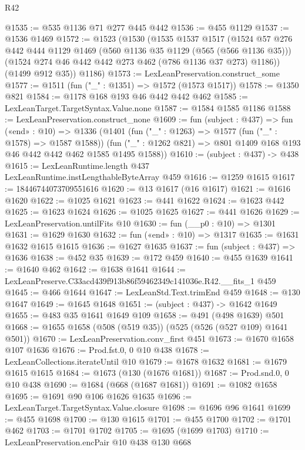 \begin{lexlean}{R42}
\begin{coremodule}
@1535 := @535 @1136 @71 @277 @445 @442
@1536 := @455 @1129
@1537 := @1536 @1469
@1572 := @1523
    (@1530
      (@1535
        @1537
        @1517
        (@1524
          @57
          @276
          @442
          @444
          @1129
          @1469
          (@560 @1136 @35 @1129 (@565 (@566 @1136 @35)))
          (@1524 @274 @46 @442 @442 @273 @462 (@786 @1136 @37 @273) @1186))
        (@1499 @912 @35))
      @1186)
@1573 := LexLeanPreservation.construct_some
@1577 := @1511 (fun ("_" : @1351) => @1572 (@1573 @1517))
@1578 := @1350 @821
@1584 := @1178 @168 @193 @46 @442 @442 @462
@1585 := LexLeanTarget.TargetSyntax.Value.none
@1587 := @1584 @1585 @1186
@1588 := LexLeanPreservation.construct_none
@1609 := fun (subject : @437) =>
  fun («end» : @10) =>
  @1336
    (@1401
      (fun ("_" : @1263) => @1577 (fun ("_" : @1578) => @1587 @1588))
      (fun ("_" : @1262 @821) => @801 @1409 @168 @193 @46 @442 @442 @462 @1585 @1495 @1588))
@1610 := (subject : @437) -> @438
@1615 := LexLeanRuntime.length @437 LexLeanRuntime.instLengthableByteArray @459
@1616 := @1259 @1615
@1617 := 18446744073709551616
@1620 := @13 @1617 (@16 @1617)
@1621 := @1616 @1620
@1622 := @1025 @1621
@1623 := @441 @1622
@1624 := @1623 @442
@1625 := @1623 @1624
@1626 := @1025 @1625
@1627 := @441 @1626
@1629 := LexLeanPreservation.untilFits @10
@1630 := fun (__p0 : @10) => @1301
@1631 := @1629 @1630
@1632 := fun («end» : @10) => @1317
@1635 := @1631 @1632 @1615 @1615
@1636 := @1627 @1635
@1637 := fun (subject : @437) => @1636
@1638 := @452 @35
@1639 := @172 @459
@1640 := @455 @1639
@1641 := @1640 @462
@1642 := @1638 @1641
@1644 := LexLeanPreserve.C33acd439f913b86f59462349c141036e.R42.__fits_1 @459
@1645 := @466 @1644
@1647 := LexLeanStd.Text.trimEnd @459
@1648 := @130 @1647
@1649 := @1645 @1648
@1651 := (subject : @437) -> @1642 @1649
@1655 := @483 @35 @1641 @1649 @109
@1658 := @491 (@498 @1639) @501
@1668 := @1655 @1658 (@508 (@519 @35)) (@525 (@526 (@527 @109) @1641 @501))
@1670 := LexLeanPreservation.conv_first @451
@1673 := @1670 @1658 @107 @1636
@1676 := Prod.fst.{0, 0} @10 @438
@1678 := LexLeanCollections.iterateUntil @10
@1679 := @1678 @1632
@1681 := @1679 @1615 @1615
@1684 := @1673 (@130 (@1676 @1681))
@1687 := Prod.snd.{0, 0} @10 @438
@1690 := @1684 (@668 (@1687 @1681))
@1691 := @1082 @1658
@1695 := @1691 @90 @106 @1626 @1635
@1696 := LexLeanTarget.TargetSyntax.Value.closure
@1698 := @1696 @96 @1641
@1699 := @455 @1698
@1700 := @130 @1615
@1701 := @455 @1700
@1702 := @1701 @462
@1703 := @1701 @1702
@1705 := @1695 (@1699 @1703)
@1710 := LexLeanPreservation.encPair @10 @438 @130 @668

\end{coremodule}
\end{lexlean}
